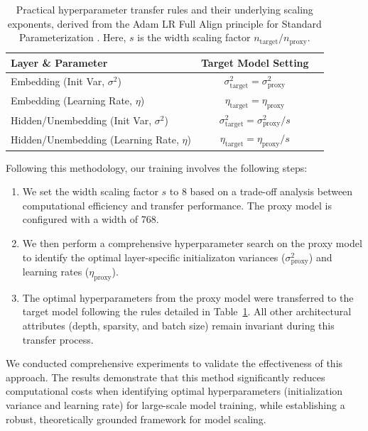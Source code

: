 \documentclass{article}
\begin{document}
\begin{table}[h!]
\centering
\caption{Practical hyperparameter transfer rules and their underlying scaling exponents, derived from the Adam LR Full Align principle for Standard Parameterization \citep{everett2024scaling}. Here, $s$ is the width scaling factor $n_{\text{target}} / n_{\text{proxy}}$.}

\label{tab:practical_transfer}
\begin{tabular}{lcl}
\toprule
\textbf{Layer \& Parameter}  & \textbf{Target Model Setting} \\ 
\midrule
Embedding (Init Var, $\sigma^2$) & $\sigma^2_{\text{target}} = \sigma^2_{\text{proxy}}$ \\
Embedding (Learning Rate, $\eta$) & $\eta_{\text{target}} = \eta_{\text{proxy}}$ \\ 
\midrule
Hidden/Unembedding (Init Var, $\sigma^2$) & $\sigma^2_{\text{target}} = \sigma^2_{\text{proxy}} / s$ \\
Hidden/Unembedding (Learning Rate, $\eta$)  & $\eta_{\text{target}} = \eta_{\text{proxy}} / s$ \\ 
\bottomrule
\end{tabular}
\end{table}

Following this methodology, our training involves the following steps:
\begin{enumerate}
    \item We set the width scaling factor $s$ to 8 based on a trade-off analysis between computational efficiency and transfer performance. The proxy model is configured with a width of 768.
    \item We then perform a comprehensive hyperparameter search on the proxy model to identify the optimal layer-specific initializaton variances ($\sigma^2_{\text{proxy}}$) and learning rates ($\eta_{\text{proxy}}$).
    \item The optimal hyperparameters from the proxy model were transferred to the target model following the rules detailed in Table~\ref{tab:practical_transfer}. All other architectural attributes (depth, sparsity, and batch size) remain invariant during this transfer process.
\end{enumerate} 

We conducted comprehensive experiments to validate the effectiveness of this approach. The results demonstrate that this method significantly reduces computational costs when identifying optimal hyperparameters (initialization variance and learning rate) for large-scale model training, while establishing a robust, theoretically grounded framework for model scaling.
\end{document}
